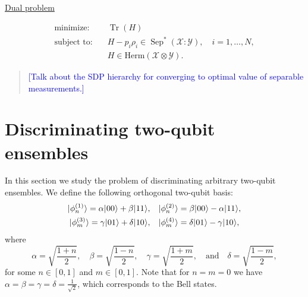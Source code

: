 \documentclass[11pt]{article}
\theoremstyle{definition}
\newcommand{\comment}[1]{\begin{quote}\sf 
    \textcolor{blue}{[#1]}\end{quote}}
\newcommand{\microspace}{\mspace{0.5mu}}
\newcommand{\tr}{\operatorname{Tr}}
\newcommand{\sep}{\operatorname{Sep}}
\newcommand{\ket}[1]{
  \lvert\microspace #1 \microspace \rangle}
\newcommand{\setft}[1]{\mathrm{#1}}
\newcommand{\Herm}{\setft{Herm}}
\newcommand{\X}{\mathcal{X}}
\newcommand{\Y}{\mathcal{Y}}
\begin{document}
\begin{center}
  \begin{minipage}{5in}
    \centerline{\underline{Dual problem}}\vspace{-4mm}
    \begin{equation} \label{eq:sep-dual}
    \begin{aligned}
      \text{minimize:}\quad & \tr(H) \\
      \text{subject to:}\quad & H - p_i \rho_i \in \sep^*(\X : \Y), \quad i =
        1, \ldots, N, \\
      & H \in \Herm(\X \otimes \Y).
    \end{aligned}
    \end{equation}    
  \end{minipage}
\end{center}

\comment{Talk about the SDP hierarchy for converging to optimal value of
separable measurements.}

\section{Discriminating two-qubit ensembles}
\label{sec:discriminating-two-qubit-ensembles}

In this section we study the problem of discriminating arbitrary two-qubit
ensembles. We define the following orthogonal two-qubit basis:
\begin{equation}\label{eq:four-general-parameterized-states}
\begin{aligned}
    \ket{\phi_n^{(1)}} = \alpha \ket{00} + \beta \ket{11}, &\quad
    \ket{\phi_n^{(2)}} = \beta \ket{00} - \alpha \ket{11}, \\
    \ket{\phi_m^{(3)}} = \gamma \ket{01} + \delta \ket{10}, &\quad
    \ket{\phi_m^{(4)}} = \delta \ket{01} - \gamma \ket{10},	
\end{aligned}
\end{equation}
where 
\begin{equation} \label{eq:alpha_beta}
    \alpha = \sqrt{\frac{1 + n}{2}}, 
    \quad
    \beta = \sqrt{\frac{1-n}{2}},
    \quad
    \gamma = \sqrt{\frac{1+m}{2}},
    \quad \text{and} \quad
    \delta = \sqrt{\frac{1-m}{2}},
\end{equation}
for some $n \in [0,1]$ and $m \in [0,1]$. Note that for $n = m = 0$ we have
$\alpha = \beta = \gamma = \delta = \frac{1}{\sqrt{2}}$, which corresponds to
the Bell states.
\end{document}
